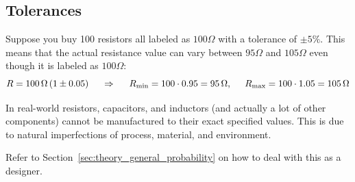 \subsection{Tolerances}\label{sec:theory_general_tolerances}

Suppose you buy 100 resistors all labeled as \(100 \Omega\)
with a tolerance of \(\pm 5\%\). This means that the actual
resistance value can vary between \(95 \Omega\) and \(105 \Omega\)
even though it is labeled as \(100 \Omega\):
\[
  R = 100\,\Omega\,(1 \pm 0.05) \hspace{0.5cm} \Rightarrow \hspace{0.5cm}
  R_{\text{min}} = 100 \cdot 0.95 = 95\,\Omega, \hspace{0.5cm} R_{\text{max}} = 100 \cdot 1.05 = 105\,\Omega
\]

In real-world resistors, capacitors, and inductors (and
actually a lot of other components) cannot be manufactured to
their exact specified values. This is due to natural
imperfections of process, material, and environment.

Refer to Section~\ref{sec:theory_general_probability} on how to deal
with this as a designer.

